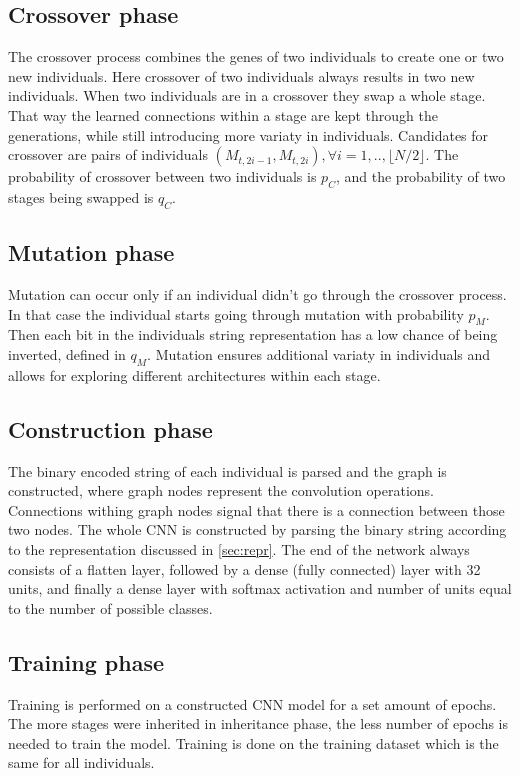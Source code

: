 \documentclass[eng]{simposium}
\begin{document}
\subsection{Crossover phase}
The crossover process combines the genes of two individuals to create one or two new individuals.
Here crossover of two individuals always results in two new individuals.
When two individuals are in a crossover they swap a whole stage.
That way the learned connections within a stage are kept through the generations, while still introducing more variaty in individuals.
Candidates for crossover are pairs of individuals $(M_{t,2i-1}, M_{t,2i}), \forall i=1,..,\lfloor N/2\rfloor $.
The probability of crossover between two individuals is $p_C$, and the probability of two stages being swapped is $q_C$.

\subsection{Mutation phase}
Mutation can occur only if an individual didn't go through the crossover process.
In that case the individual starts going through mutation with probability $p_M$.
Then each bit in the individuals string representation has a low chance of being inverted, defined in $q_M$.
Mutation ensures additional variaty in individuals and allows for exploring different architectures within each stage.

\subsection{Construction phase}
The binary encoded  string of each individual is parsed and the graph is constructed, where graph nodes represent the convolution operations.
Connections withing graph nodes signal that there is a connection between those two nodes.
The whole CNN is constructed by parsing the binary string according to the representation discussed in \ref{sec:repr}. 
The end of the network always consists of a flatten layer, followed by a dense (fully connected) layer with 32 units, and finally a dense 
layer with softmax activation and number of units equal to the number of possible classes.

\subsection{Training phase}
Training is performed on a constructed CNN model for a set amount of epochs. 
The more stages were inherited in inheritance phase, the less number of epochs is needed to train the model.
Training is done on the training dataset which is the same for all individuals.
\end{document}
